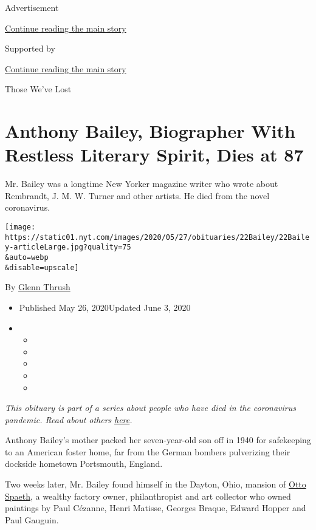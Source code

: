 Advertisement

\protect\hyperlink{after-top}{Continue reading the main story}

Supported by

\protect\hyperlink{after-sponsor}{Continue reading the main story}

Those We've Lost

\hypertarget{anthony-bailey-biographer-with-restless-literary-spirit-dies-at-87}{%
\section{Anthony Bailey, Biographer With Restless Literary Spirit, Dies
at
87}\label{anthony-bailey-biographer-with-restless-literary-spirit-dies-at-87}}

Mr. Bailey was a longtime New Yorker magazine writer who wrote about
Rembrandt, J. M. W. Turner and other artists. He died from the novel
coronavirus.

\texttt{[image: https://static01.nyt.com/images/2020/05/27/obituaries/22Bailey/22Bailey-articleLarge.jpg?quality=75\\\&auto=webp\\\&disable=upscale]}

By \href{https://www.nytimes.com/by/glenn-thrush}{Glenn Thrush}

\begin{itemize}
\item
  Published May 26, 2020Updated June 3, 2020
\item
  \begin{itemize}
  \item
  \item
  \item
  \item
  \item
  \end{itemize}
\end{itemize}

\emph{This obituary is part of a series about people who have died in
the coronavirus pandemic. Read about others}
\href{https://www.nytimes.com/series/people-who-have-died-of-the-coronavirus}{\emph{here}}\emph{.}

Anthony Bailey's mother packed her seven-year-old son off in 1940 for
safekeeping to an American foster home, far from the German bombers
pulverizing their dockside hometown Portsmouth, England.

Two weeks later, Mr. Bailey found himself in the Dayton, Ohio, mansion
of
\href{https://www.nytimes.com/1966/10/09/archives/otto-spaeth-dies-art-collector-69-former-whitney-executive-was.html}{Otto
Spaeth}, a wealthy factory owner, philanthropist and art collector who
owned paintings by Paul Cézanne, Henri Matisse, Georges Braque, Edward
Hopper and Paul Gauguin.

